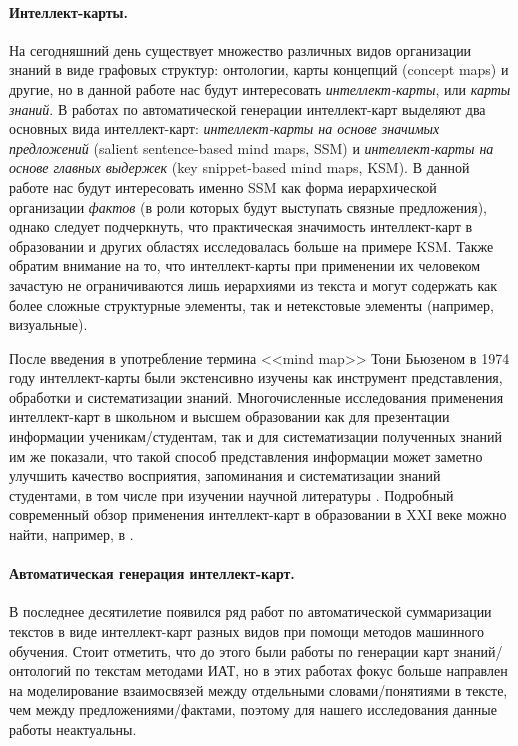 \documentclass[12pt]{article}
\begin{document}
\paragraph{Интеллект-карты.} На сегодняшний день существует множество различных видов организации знаний в виде графовых структур: онтологии, карты концепций (concept maps) и другие, но в данной работе нас будут интересовать \textit{интеллект-карты}, или \textit{карты знаний}. В работах по автоматической генерации интеллект-карт выделяют два основных вида интеллект-карт: \textit{интеллект-карты на основе значимых предложений} (salient sentence-based mind maps, SSM) и \textit{интеллект-карты на основе главных выдержек} (key snippet-based mind maps, KSM). В данной работе нас будут интересовать именно SSM как форма иерархической организации \textit{фактов} (в роли которых будут выступать связные предложения), однако следует подчеркнуть, что практическая значимость интеллект-карт в образовании и других областях исследовалась больше на примере KSM. Также обратим внимание на то, что интеллект-карты при применении их человеком зачастую не ограничиваются лишь иерархиями из текста и могут содержать как более сложные структурные элементы, так и нетекстовые элементы (например, визуальные).

После введения в употребление термина <<mind map>> Тони Бьюзеном в 1974 году интеллект-карты были экстенсивно изучены как инструмент представления, обработки и систематизации знаний. Многочисленные исследования применения интеллект-карт в школьном и высшем образовании как для презентации информации ученикам/студентам, так и для систематизации полученных знаний им же показали, что такой способ представления информации может заметно улучшить качество восприятия, запоминания и систематизации знаний студентами, в том числе при изучении научной литературы \cite{guerrero2015mind}. Подробный современный обзор применения интеллект-карт в образовании в XXI веке можно найти, например, в \cite{mitra2023tradition}.

\paragraph{Автоматическая генерация интеллект-карт.} В последнее десятилетие появился ряд работ по автоматической суммаризации текстов в виде интеллект-карт разных видов при помощи методов машинного обучения. Стоит отметить, что до этого были работы по генерации карт знаний/онтологий по текстам методами ИАТ, но в этих работах фокус больше направлен на моделирование взаимосвязей между отдельными словами/понятиями в тексте, чем между предложениями/фактами, поэтому для нашего исследования данные работы неактуальны.
\end{document}
